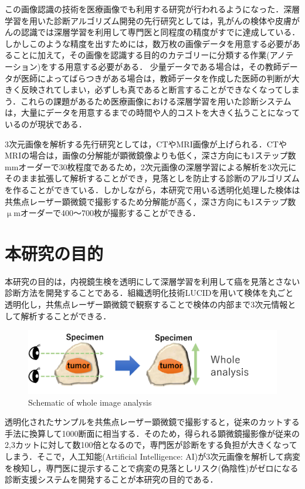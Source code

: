この画像認識の技術を医療画像でも利用する研究が行われるようになった．深層学習を用いた診断アルゴリズム開発の先行研究としては，乳がん\cite{wang2016deep}の検体や皮膚がん\cite{esteva2017dermatologist}の認識では深層学習を利用して専門医と同程度の精度がすでに達成している．
しかしこのような精度を出すためには，数万枚の画像データを用意する必要があることに加えて，その画像を認識する目的のカテゴリーに分類する作業(アノテーション)をする用意する必要がある．
少量データである場合は，その教師データが医師によってばらつきがある場合は，教師データを作成した医師の判断が大きく反映されてしまい，必ずしも真であると断言することができなくなってしまう．これらの課題があるため医療画像における深層学習を用いた診断システムは，大量にデータを用意するまでの時間や人的コストを大きく払うことになっているのが現状である．

3次元画像を解析する先行研究としては，CTやMRI画像が上げられる\cite{dou20163d}．CTやMRIの場合は，画像の分解能が顕微鏡像よりも低く，深さ方向にも1ステップ数mmオーダーで30枚程度であるため，2次元画像の深層学習による解析を3次元にそのまま拡張して解析することができ，見落としを防止する診断のアルゴリズムを作ることができている．しかしながら，本研究で用いる透明化処理した検体は共焦点レーザー顕微鏡で撮影するため分解能が高く，深さ方向にも1ステップ数$\upmu$mオーダーで400〜700枚が撮影することができる．

\section{本研究の目的}
本研究の目的は，内視鏡生検を透明にして深層学習を利用して癌を見落とさない診断方法を開発することである．組織透明化技術LUCIDを用いて検体を丸ごと透明化し，共焦点レーザー顕微鏡で観察することで検体の内部まで3次元情報として解析することができる．

\begin{figure}[H]
	\centering
	\includegraphics[width=0.8\linewidth]{fig/chapter1/whole_image_analysis}
	\caption{Schematic of whole image analysis}
	\label{fig:wholeimageanalysis}
\end{figure}

透明化されたサンプルを共焦点レーザー顕微鏡で撮影すると，従来のカットする手法に換算して1000断面に相当する．そのため，得られる顕微鏡撮影像が従来の2,3カットに対して数100倍となるので，専門医が診断をする負担が大きくなってしまう．そこで，人工知能(Artificial Intelligence: AI)が3次元画像を解析して病変を検知し，専門医に提示することで病変の見落としリスク(偽陰性)がゼロになる診断支援システムを開発することが本研究の目的である．

